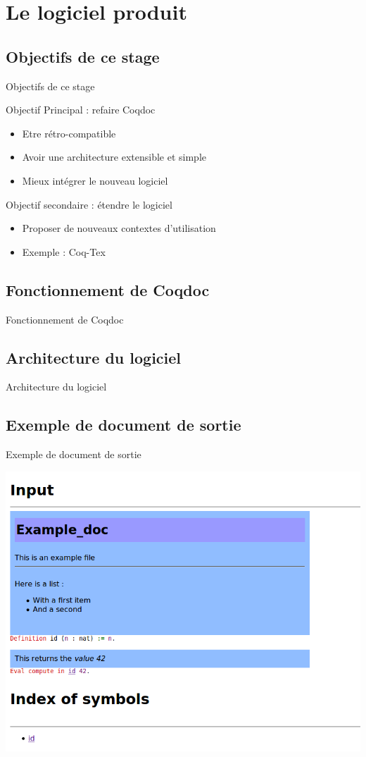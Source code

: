 \documentclass[compress]{beamer}
\newenvironment{tframe}[1]{
  \subsection{#1}
  \begin{frame}{#1}
  }{
  \end{frame}
  }
\begin{document}
\section{Le logiciel produit}

\begin{tframe}{Objectifs de ce stage}
  \begin{block}{Objectif Principal : refaire Coqdoc}
    \begin{itemize}
      \item Etre rétro-compatible
      \item Avoir une architecture extensible et simple
      \item Mieux intégrer le nouveau logiciel
    \end{itemize}
  \end{block}
  \begin{block}{Objectif secondaire : étendre le logiciel}
    \begin{itemize}
      \item Proposer de nouveaux contextes d'utilisation
      \item Exemple : Coq-Tex
    \end{itemize}
  \end{block}
\end{tframe}

\begin{tframe}{Fonctionnement de Coqdoc}
  \begin{figure}
    
  \end{figure}
\end{tframe}

\begin{tframe}{Architecture du logiciel}
  \begin{figure}
    
  \end{figure}
\end{tframe}

\begin{tframe}{Exemple de document de sortie}
\begin{center}
\includegraphics[scale=0.4]{input.png}
\end{center}
\end{tframe}
\end{document}
